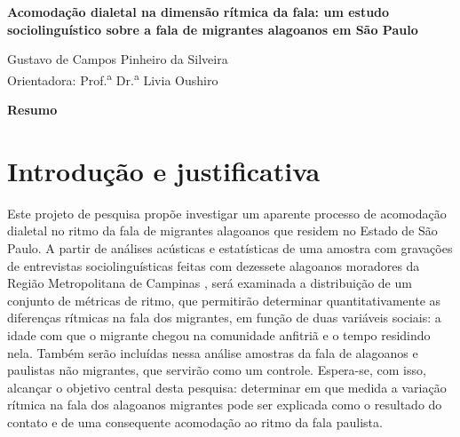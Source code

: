 \documentclass[
	a4paper,	%
	12pt,		%
	]{article}	%
\begin{document}
	
{ %

	\begin{center}
		{\bfseries\Large\sffamily
		    Acomodação dialetal na dimensão rítmica da fala: um estudo sociolinguístico
		    sobre a fala de migrantes alagoanos em São Paulo
		}
	\end{center}
}
	
\vspace{0.35em}

{ %

	\begin{flushright} 
		Gustavo de Campos Pinheiro da Silveira \\ 
		\vspace{5pt}
		Orientadora: Prof.\textsuperscript{a} Dr.\textsuperscript{a} Livia Oushiro
	\end{flushright}

	\begin{center} 
	    {\bfseries\sffamily Resumo} \\ 
	\end{center}
	\par
	\vspace{0.35em}
		
}

\section{Introdução e justificativa} 
\label{intro}

	Este projeto de pesquisa propõe investigar um aparente processo de acomodação dialetal no ritmo
	da fala de migrantes alagoanos que residem no Estado de São Paulo. A partir de análises
	acústicas e estatísticas de uma amostra com gravações de entrevistas sociolinguísticas feitas
	com dezessete alagoanos moradores da Região Metropolitana de Campinas \citep{Oushiro2018}, será
	examinada a distribuição de um conjunto de métricas de ritmo, que permitirão determinar
	quantitativamente as diferenças rítmicas na fala dos migrantes, em função de duas variáveis
	sociais: a idade com que o migrante chegou na comunidade anfitriã e o tempo residindo nela.
	Também serão incluídas nessa análise amostras da fala de alagoanos e paulistas não migrantes,
	que servirão como um controle. Espera-se, com isso, alcançar o objetivo central desta pesquisa:
	determinar em que medida a variação rítmica na fala dos alagoanos migrantes pode ser explicada
	como o resultado do contato e de uma consequente acomodação ao ritmo da fala paulista.
	
\end{document}

